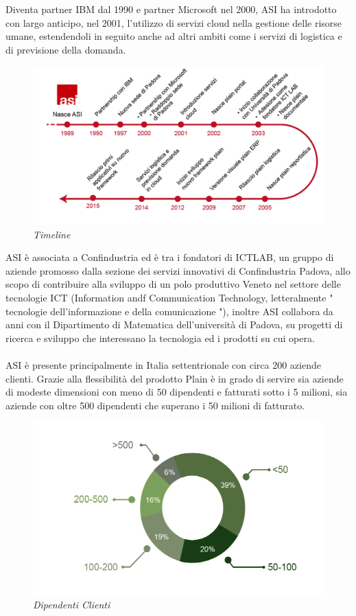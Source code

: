 Diventa partner IBM dal 1990 e partner Microsoft nel 2000, ASI ha introdotto con largo anticipo, nel 2001, l'utilizzo di servizi cloud nella gestione delle risorse umane, estendendoli in seguito anche ad altri ambiti come i servizi di logistica e di previsione della domanda.

\begin{figure}[ht]
	\centering
	\includegraphics[scale=0.25]{immagini/azienda/timeline}
	\caption{\textit{\textit{Timeline \asi}}}
\end{figure}\FloatBarrier

ASI è associata a Confindustria ed è tra i fondatori di ICTLAB, un gruppo di aziende promosso dalla sezione dei servizi innovativi di Confindustria Padova, allo scopo di contribuire alla sviluppo di un polo produttivo Veneto nel settore delle tecnologie ICT (Information andf Communication Technology, letteralmente " tecnologie dell'informazione e della comunicazione "), inoltre ASI collabora da anni con il Dipartimento di Matematica dell'università di Padova, su progetti di ricerca e sviluppo che interessano la tecnologia ed i prodotti su cui opera.
\\\\
ASI è presente principalmente in Italia settentrionale con circa 200 aziende clienti. Grazie alla flessibilità del prodotto Plain è in grado di servire sia aziende di modeste dimensioni con meno di 50 dipendenti e fatturati sotto i 5 milioni, sia aziende con oltre 500 dipendenti che superano i 50 milioni di fatturato.

\begin{figure}[ht]
	\centering
	\includegraphics[scale=0.35]{immagini/azienda/dipendenti_clienti}
	\caption{\textit{Dipendenti Clienti \asi}}
\end{figure}\FloatBarrier

